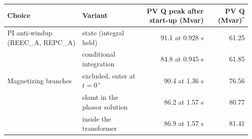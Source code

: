 \begin{tabular}{llrr}
\toprule
Choice & Variant & PV Q peak after start-up (Mvar) & PV Q (Mvar)$^*$ \\
\midrule
PI anti-windup (REEC\_A, REPC\_A) & state (integral held) & 91.1 at 0.928 s & 61.25 \\
 & conditional integration & 84.8 at 0.945 s & 61.85 \\
\midrule Magnetizing branches & excluded, enter at $t=0^+$ & 90.4 at 1.36 s & 76.56 \\
 & shunt in the phasor solution & 86.2 at 1.57 s & 80.77 \\
 & inside the transformer & 86.9 at 1.57 s & 81.41 \\
\bottomrule
\end{tabular}
